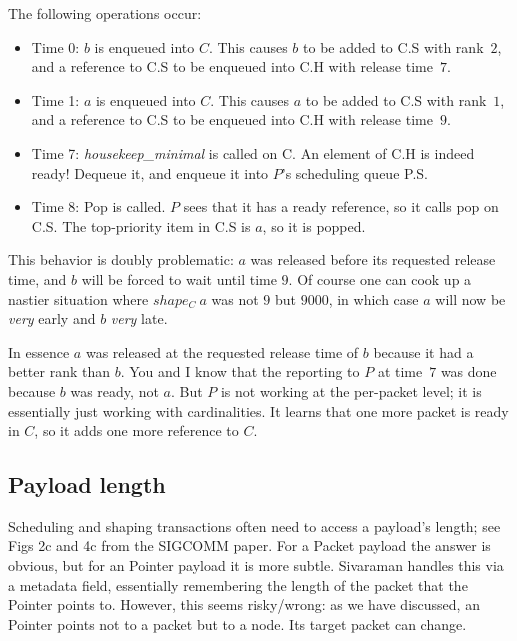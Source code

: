 \documentclass{article}
\begin{document}
The following operations occur:
\begin{itemize}
\item Time 0: $b$ is enqueued into $C$. 
This causes $b$ to be added to C.S with rank~$2$, and a reference to C.S 
to be enqueued into C.H with release time~$7$.
\item Time 1: $a$ is enqueued into $C$. 
This causes $a$ to be added to C.S with rank~$1$, and a reference to C.S 
to be enqueued into C.H with release time~$9$.
\item Time 7: \textit{housekeep\_minimal} is called on C. 
An element of C.H is indeed ready! Dequeue it, and enqueue it into 
$P$'s scheduling queue P.S.
\item Time 8: Pop is called. $P$ sees that it has a ready reference, so it calls 
pop on C.S. The top-priority item in C.S is $a$, so it is popped.
\end{itemize}

This behavior is doubly problematic: $a$ was released before its requested 
release time, and $b$ will be forced to wait until time $9$. 
Of course one can cook up a nastier situation where $\mathit{shape_{C}~a}$ 
was not $9$ but $9000$, in which case 
$a$ will now be \emph{very} early and $b$ \emph{very} late.
 
In essence $a$ was released at the requested release time of $b$
because it had a better rank than $b$.
You and I know that the reporting to $P$ at time~$7$ was done because $b$ 
was ready, not $a$. 
But $P$ is not working at the per-packet level; it is essentially just working with cardinalities. 
It learns that one more packet is ready in $C$, so it adds one more reference to $C$.

\subsection{Payload length}
Scheduling and shaping transactions often need to access a payload's length; 
see Figs 2c and 4c from the SIGCOMM paper. 
For a Packet payload the answer is obvious, but for an Pointer payload it is more subtle. 
Sivaraman handles this via a metadata field, essentially remembering the length of the 
packet that the Pointer points to. 
However, this seems risky/wrong: as we have discussed, an Pointer points not to 
a packet but to a node. Its target packet can change.
\end{document}
